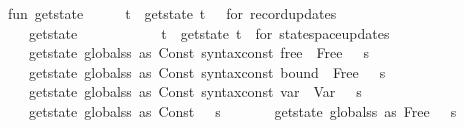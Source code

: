 \begin{isabellebody}
\isanewline
\ \ \ \ fun\ get{\isacharunderscore}state\ {\isacharparenleft}\ {\isacharunderscore}\ {\isachardollar}\ {\isacharunderscore}\ {\isachardollar}\ t{\isacharparenright}\ {\isacharequal}\ get{\isacharunderscore}state\ t\ \ {\isacharparenleft}{\isacharasterisk}\ for\ record{\isacharminus}updates{\isacharasterisk}{\isacharparenright}\isanewline
\ \ \ \ \ \ {\isacharbar}\ get{\isacharunderscore}state\ {\isacharparenleft}\ {\isacharunderscore}\ {\isachardollar}\ {\isacharunderscore}\ {\isachardollar}\ {\isacharunderscore}\ {\isachardollar}\ {\isacharunderscore}\ {\isachardollar}\ {\isacharunderscore}\ {\isachardollar}\ t{\isacharparenright}\ {\isacharequal}\ get{\isacharunderscore}state\ t\ {\isacharparenleft}{\isacharasterisk}\ for\ statespace{\isacharminus}updates\ {\isacharasterisk}{\isacharparenright}\isanewline
\ \ \ \ \ \ {\isacharbar}\ get{\isacharunderscore}state\ {\isacharparenleft}globals{\isachardollar}{\isacharparenleft}s\ as\ Const\ {\isacharparenleft}{\isacharat}{\isacharbraceleft}syntax{\isacharunderscore}const\ {\isachardoublequote}{\isacharunderscore}free{\isachardoublequote}{\isacharbraceright}{\isacharcomma}{\isacharunderscore}{\isacharparenright}\ {\isachardollar}\ Free\ {\isacharunderscore}{\isacharparenright}{\isacharparenright}\ {\isacharequal}\ s\isanewline
\ \ \ \ \ \ {\isacharbar}\ get{\isacharunderscore}state\ {\isacharparenleft}globals{\isachardollar}{\isacharparenleft}s\ as\ Const\ {\isacharparenleft}{\isacharat}{\isacharbraceleft}syntax{\isacharunderscore}const\ {\isachardoublequote}{\isacharunderscore}bound{\isachardoublequote}{\isacharbraceright}{\isacharcomma}{\isacharunderscore}{\isacharparenright}\ {\isachardollar}\ Free\ {\isacharunderscore}{\isacharparenright}{\isacharparenright}\ {\isacharequal}\ s\isanewline
\ \ \ \ \ \ {\isacharbar}\ get{\isacharunderscore}state\ {\isacharparenleft}globals{\isachardollar}{\isacharparenleft}s\ as\ Const\ {\isacharparenleft}{\isacharat}{\isacharbraceleft}syntax{\isacharunderscore}const\ {\isachardoublequote}{\isacharunderscore}var{\isachardoublequote}{\isacharbraceright}{\isacharcomma}{\isacharunderscore}{\isacharparenright}\ {\isachardollar}\ Var\ {\isacharunderscore}{\isacharparenright}{\isacharparenright}\ {\isacharequal}\ s\isanewline
\ \ \ \ \ \ {\isacharbar}\ get{\isacharunderscore}state\ {\isacharparenleft}globals{\isachardollar}{\isacharparenleft}s\ as\ Const\ {\isacharunderscore}{\isacharparenright}{\isacharparenright}\ {\isacharequal}\ s\isanewline
\ \ \ \ \ \ {\isacharbar}\ get{\isacharunderscore}state\ {\isacharparenleft}globals{\isachardollar}{\isacharparenleft}s\ as\ Free\ {\isacharunderscore}{\isacharparenright}{\isacharparenright}\ {\isacharequal}\ s\isanewline

\end{isabellebody}
